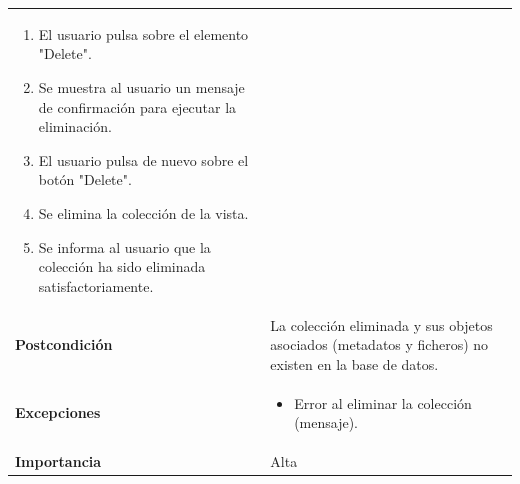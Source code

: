 \documentclass[
]{article}
\providecommand{\tightlist}{%
  \setlength{\itemsep}{0pt}\setlength{\parskip}{0pt}}
\begin{document}
\begin{longtable}[]{@{}ll@{}}
\begin{minipage}[t]{0.75\columnwidth}
\begin{enumerate}
\def\labelenumi{\arabic{enumi}.}
\tightlist
\item
  El usuario pulsa sobre el elemento "Delete".
\item
  Se muestra al usuario un mensaje de confirmación para ejecutar la
  eliminación.
\item
  El usuario pulsa de nuevo sobre el botón "Delete".
\item
  Se elimina la colección de la vista.
\item
  Se informa al usuario que la colección ha sido eliminada
  satisfactoriamente.
\end{enumerate}\strut
\end{minipage}\tabularnewline
\begin{minipage}[t]{0.19\columnwidth}\raggedright
\textbf{Postcondición}\strut
\end{minipage} & \begin{minipage}[t]{0.75\columnwidth}\raggedright
La colección eliminada y sus objetos asociados (metadatos y ficheros) no
existen en la base de datos.\strut
\end{minipage}\tabularnewline
\begin{minipage}[t]{0.19\columnwidth}\raggedright
\textbf{Excepciones}\strut
\end{minipage} & \begin{minipage}[t]{0.75\columnwidth}\raggedright
\begin{itemize}
\tightlist
\item
  Error al eliminar la colección (mensaje).
\end{itemize}\strut
\end{minipage}\tabularnewline
\begin{minipage}[t]{0.19\columnwidth}\raggedright
\textbf{Importancia}\strut
\end{minipage} & \begin{minipage}[t]{0.75\columnwidth}\raggedright
Alta\strut
\end{minipage}\tabularnewline
\bottomrule
\end{longtable}
\end{document}
